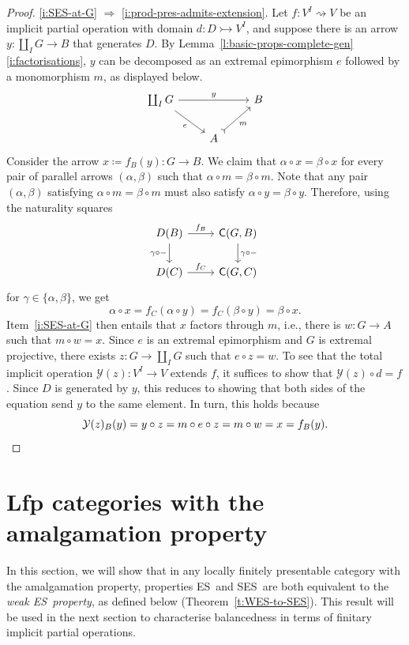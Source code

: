\documentclass[a4paper,10pt,reqno]{amsart}
\theoremstyle{definition}
\theoremstyle{remark}
\newcommand{\cat}{{\sf C}}								%
\newcommand{\yo}{\mathcal{Y}}
\newcommand{\IMP}{\Rightarrow}						%
\newcommand{\ES}{\textnormal{ES}}
\newcommand{\SES}{\textnormal{SES}}
\begin{document}
\begin{proof}
\ref{i:SES-at-G} $\IMP$ \ref{i:prod-pres-admits-extension}. Let $f\colon V^{I}\rightsquigarrow V$ be an implicit partial operation with domain $d\colon D\rightarrowtail V^{I}$, and suppose there is an arrow $y\colon \coprod_{I}G \to B$ that generates $D$. By Lemma~\ref{l:basic-props-complete-gen}\ref{i:factorisations}, $y$ can be decomposed as an extremal epimorphism $e$ followed by a monomorphism $m$, as displayed below.
\[\begin{tikzcd}
\coprod_{I}{G} \arrow{rr}{y} \arrow{dr}[swap]{e} & & B \\
& A \arrow[rightarrowtail]{ur}[swap]{m}
\end{tikzcd}\]
Consider the arrow $x\coloneqq f_{B}(y)\colon G\to B$. We claim that $\alpha\circ x = \beta\circ x$ for every pair of parallel arrows $(\alpha,\beta)$ such that $\alpha\circ m = \beta\circ m$. Note that any pair $(\alpha,\beta)$ satisfying $\alpha\circ m = \beta\circ m$ must also satisfy $\alpha\circ y = \beta\circ y$. Therefore, using the naturality squares
\[\begin{tikzcd}
D(B) \arrow{r}{f_{B}} \arrow{d}[swap]{\gamma\circ -} & \cat(G,B) \arrow{d}{\gamma\circ -} \\
D(C) \arrow{r}{f_{C}} & \cat(G,C)
\end{tikzcd}\]
for $\gamma\in \{\alpha,\beta\}$, we get
\[
\alpha\circ x = f_{C}(\alpha\circ y) = f_{C}(\beta\circ y) = \beta\circ x.
\]
Item~\ref{i:SES-at-G} then entails that $x$ factors through $m$, i.e., there is $w\colon G\to A$ such that $m\circ w = x$. Since $e$ is an extremal epimorphism and $G$ is extremal projective, there exists $z\colon G\to \coprod_{I}{G}$ such that $e\circ z = w$. To see that the total implicit operation $\yo(z)\colon V^{I}\to V$ extends $f$, it suffices to show that $\yo(z)\circ d = f$. Since $D$ is generated by $y$, this reduces to showing that both sides of the equation send $y$ to the same element. In turn, this holds because
\[
\yo(z)_{B}(y) = y\circ z = m\circ e \circ z = m\circ w = x = f_{B}(y).\qedhere
\] 
\end{proof}


\section{Lfp categories with the amalgamation property}\label{s:lfps-with-AP}

In this section, we will show that in any locally finitely presentable category with the amalgamation property, properties \ES~and \SES~are both equivalent to the \emph{weak \ES~property}, as defined below (Theorem~\ref{t:WES-to-SES}). This result will be used in the next section to characterise balancedness in terms of finitary implicit partial operations.
\end{document}
